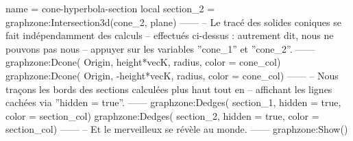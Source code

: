 \documentclass[varwidth, border = 3pt]{standalone}
\begin{document}
\begin{luadraw}{name = cone-hyperbola-section}
    local section_2 = graphzone:Intersection3d(cone_2, plane)
------
-- Le tracé des solides coniques se fait indépendamment des calculs
-- effectués ci-dessus : autrement dit, nous ne pouvons pas nous
-- appuyer sur les variables ''cone_1'' et ''cone_2''.
------
    graphzone:Dcone(
        Origin, height*vecK, radius,
        {color = cone_col})
    graphzone:Dcone(
        Origin, -height*vecK, radius,
        {color = cone_col})
------
-- Nous traçons les bords des sections calculées plus haut tout en
-- affichant les lignes cachées via ''hidden = true''.
------
    graphzone:Dedges(
        section_1,
        {hidden = true, color = section_col})
    graphzone:Dedges(
        section_2,
        {hidden = true, color = section_col})
------
-- Et le merveilleux se révèle au monde.
------
    graphzone:Show()
\end{luadraw}
\end{document}
